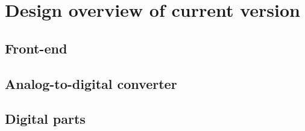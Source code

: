 \chapter{Design overview of current version}

\section{Front-end}

\section{Analog-to-digital converter}

\section{Digital parts}